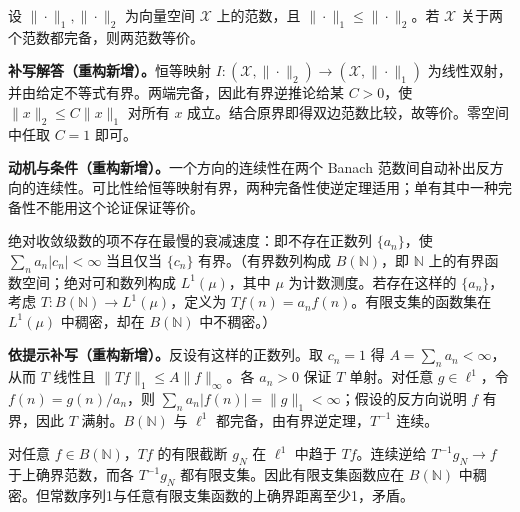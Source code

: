 \documentclass[../../main.tex]{subfiles}
\begin{document}
\begin{exercise}\label{exercise:ch05-comparable-banach-norms}
设 $\|\cdot\|_1,\|\cdot\|_2$ 为向量空间 $\mathcal X$ 上的范数，且 $\|\cdot\|_1\le\|\cdot\|_2$。若 $\mathcal X$ 关于两个范数都完备，则两范数等价。
\end{exercise}
\begin{solution}
\textbf{补写解答（重构新增）。}恒等映射 $I:(\mathcal X,\|\cdot\|_2)\to(\mathcal X,\|\cdot\|_1)$ 为线性双射，并由给定不等式有界。两端完备，因此有界逆推论给某 $C>0$，使 $\|x\|_2\le C\|x\|_1$ 对所有 $x$ 成立。结合原界即得双边范数比较，故等价。零空间中任取 $C=1$ 即可。
\end{solution}
\begin{remark}
\textbf{动机与条件（重构新增）。}一个方向的连续性在两个 Banach 范数间自动补出反方向的连续性。可比性给恒等映射有界，两种完备性使逆定理适用；单有其中一种完备性不能用这个论证保证等价。
\end{remark}
\begin{exercise}\label{exercise:ch05-no-slowest-decay}
绝对收敛级数的项不存在最慢的衰减速度：即不存在正数列 $\{a_n\}$，使 $\sum_na_n|c_n|<\infty$ 当且仅当 $\{c_n\}$ 有界。（有界数列构成 $B(\mathbb N)$，即 $\mathbb N$ 上的有界函数空间；绝对可和数列构成 $L^1(\mu)$，其中 $\mu$ 为计数测度。若存在这样的 $\{a_n\}$，考虑 $T:B(\mathbb N)\to L^1(\mu)$，定义为 $Tf(n)=a_nf(n)$。有限支集的函数集在 $L^1(\mu)$ 中稠密，却在 $B(\mathbb N)$ 中不稠密。）
\end{exercise}
\begin{solution}
\textbf{依提示补写（重构新增）。}反设有这样的正数列。取 $c_n=1$ 得 $A=\sum_na_n<\infty$，从而 $T$ 线性且 $\|Tf\|_1\le A\|f\|_\infty$。各 $a_n>0$ 保证 $T$ 单射。对任意 $g\in\ell^1$，令 $f(n)=g(n)/a_n$，则 $\sum_na_n|f(n)|=\|g\|_1<\infty$；假设的反方向说明 $f$ 有界，因此 $T$ 满射。$B(\mathbb N)$ 与 $\ell^1$ 都完备，由有界逆定理，$T^{-1}$ 连续。

对任意 $f\in B(\mathbb N)$，$Tf$ 的有限截断 $g_N$ 在 $\ell^1$ 中趋于 $Tf$。连续逆给 $T^{-1}g_N\to f$ 于上确界范数，而各 $T^{-1}g_N$ 都有限支集。因此有限支集函数应在 $B(\mathbb N)$ 中稠密。但常数序列1与任意有限支集函数的上确界距离至少1，矛盾。
\end{solution}
\end{document}
